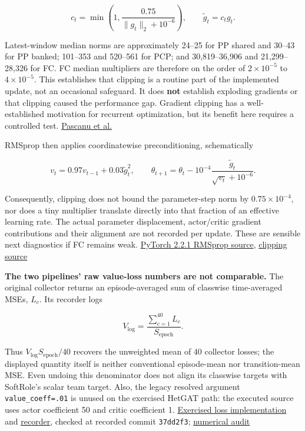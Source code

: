 \documentclass[
  10pt,
]{article}
\begin{document}
\[
c_t=\min\!\left(1,\frac{0.75}{\|g_t\|_2+10^{-6}}\right),
\qquad \widetilde g_t=c_tg_t.
\]

Latest-window median norms are approximately 24--25 for PP shared and
30--43 for PP banked; 101--353 and 520--561 for PCP; and 30,819--36,906
and 21,299--28,326 for FC. FC median multipliers are therefore on the
order of \(2\times10^{-5}\) to \(4\times10^{-5}\). This establishes that
clipping is a routine part of the implemented update, not an occasional
safeguard. It does \textbf{not} establish exploding gradients or that
clipping caused the performance gap. Gradient clipping has a
well-established motivation for recurrent optimization, but its benefit
here requires a controlled test.
\href{https://proceedings.mlr.press/v28/pascanu13.html}{Pascanu et al.}

RMSprop then applies coordinatewise preconditioning, schematically

\[
v_t=0.97v_{t-1}+0.03\widetilde g_t^2,
\qquad
\theta_{t+1}=\theta_t-
10^{-4}\frac{\widetilde g_t}{\sqrt{v_t}+10^{-6}}.
\]

Consequently, clipping does not bound the parameter-step norm by
\(0.75\times10^{-4}\), nor does a tiny multiplier translate directly
into that fraction of an effective learning rate. The actual parameter
displacement, actor/critic gradient contributions and their alignment
are not recorded per update. These are sensible next diagnostics if FC
remains weak.
\href{https://github.com/pytorch/pytorch/blob/v2.2.1/torch/optim/rmsprop.py}{PyTorch
2.2.1 RMSprop source},
\href{https://github.com/pytorch/pytorch/blob/v2.2.1/torch/nn/utils/clip_grad.py}{clipping
source}

\textbf{The two pipelines' raw value-loss numbers are not comparable.}
The original collector returns an episode-averaged sum of classwise
time-averaged MSEs, \(L_c\). Its recorder logs

\[
V_{\mathrm{log}}=\frac{\sum_{c=1}^{40}L_c}{S_{\mathrm{epoch}}}.
\]

Thus \(V_{\mathrm{log}}S_{\mathrm{epoch}}/40\) recovers the unweighted
mean of 40 collector losses; the displayed quantity itself is neither
conventional episode-mean nor transition-mean MSE. Even undoing this
denominator does not align its classwise targets with SoftRole's scalar
team target. Also, the legacy resolved argument
\texttt{value\_coeff=.01} is unused on the exercised HetGAT path: the
executed source uses actor coefficient 50 and critic coefficient 1.
\href{../../hetgat/policy.py}{Exercised loss implementation} and
\href{../../hetnet_ext/recording.py}{recorder}, checked at recorded
commit \texttt{37dd2f3};
\href{full_runs/reproduction_audit/findings.json}{numerical audit}
\end{document}
